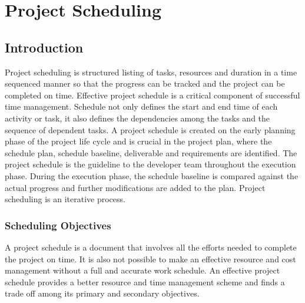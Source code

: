 \chapter{Project Scheduling}
\begin{spacing}{1}
\setlength{\parskip}{0.3in}
\graphicspath{{./Chapter5/}}

\section{Introduction}
Project scheduling is structured listing of tasks, resources and duration  in a time sequenced manner so that the progress can be tracked and the project can be completed on time. Effective project schedule is a critical component of successful time management.
Schedule not only defines the start and end time of each activity or task, it also defines the dependencies among the tasks and the sequence of dependent tasks. A project schedule is created on the early planning phase of the project life cycle and is crucial in the project plan, where the schedule plan, schedule baseline, deliverable and requirements are identified. The project schedule is the guideline to the developer team throughout the execution phase. During the execution phase, the schedule baseline is compared against the actual progress and further modifications are added to the plan. Project scheduling is an iterative process.

\subsection{Scheduling Objectives}
A project schedule is a document that involves all the efforts needed to complete the project on time. It is also not possible to make an effective resource and cost management without a full and accurate work schedule. An effective project schedule provides a better resource and time management scheme and finds a trade off among its primary and secondary objectives.


\end{spacing}
